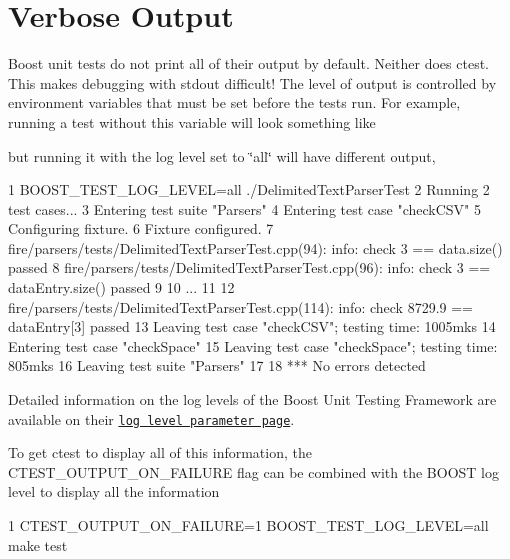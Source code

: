 \section*{Verbose Output}

Boost unit tests do not print all of their output by default. Neither does ctest. This makes debugging with stdout difficult! The level of output is controlled by environment variables that must be set before the tests run. For example, running a test without this variable will look something like


 but running it with the log level set to \char`\"{}all\char`\"{} will have different output,


\begin{DoxyCode}
1 BOOST\_TEST\_LOG\_LEVEL=all ./DelimitedTextParserTest 
2 Running 2 test cases...
3 Entering test suite "Parsers"
4 Entering test case "checkCSV"
5 Configuring fixture.
6 Fixture configured.
7 fire/parsers/tests/DelimitedTextParserTest.cpp(94): info: check 3 == data.size() passed
8 fire/parsers/tests/DelimitedTextParserTest.cpp(96): info: check 3 == dataEntry.size() passed
9 
10 ...
11 
12 fire/parsers/tests/DelimitedTextParserTest.cpp(114): info: check 8729.9 == dataEntry[3] passed
13 Leaving test case "checkCSV"; testing time: 1005mks
14 Entering test case "checkSpace"
15 Leaving test case "checkSpace"; testing time: 805mks
16 Leaving test suite "Parsers"
17 
18 *** No errors detected
\end{DoxyCode}


Detailed information on the log levels of the Boost Unit Testing Framework are available on their \href{http://www.boost.org/doc/libs/1_34_1/libs/test/doc/components/utf/parameters/log_level.html}{\tt log level parameter page}.

To get ctest to display all of this information, the C\+T\+E\+S\+T\+\_\+\+O\+U\+T\+P\+U\+T\+\_\+\+O\+N\+\_\+\+F\+A\+I\+L\+U\+RE flag can be combined with the B\+O\+O\+ST log level to display all the information


\begin{DoxyCode}
1 CTEST\_OUTPUT\_ON\_FAILURE=1 BOOST\_TEST\_LOG\_LEVEL=all make test
\end{DoxyCode}
 